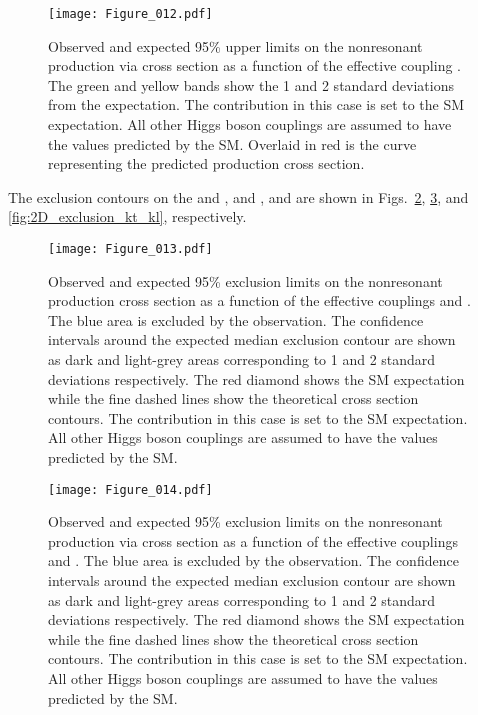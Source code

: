 \begin{figure}[htb!]
  \centering
  \texttt{[image: Figure\_012.pdf]}
  \caption{Observed and expected 95\% \CL upper limits on the nonresonant \HH production via \VBF cross section as a function of the effective coupling \CVV. The green and yellow bands show the 1 and 2 standard deviations from the expectation. The \GGF contribution in this case is set to the SM expectation. All other Higgs boson couplings are assumed to have the values predicted by the SM. Overlaid in red is the curve representing the predicted \HH production cross section.}
  \label{fig:limit_kvv_scan}
\end{figure}

The exclusion contours on the \klambda and \CVV, \CV and \CVV, \ktop and \klambda  are shown in Figs.~\ref{fig:2D_exclusion_kl_kvv}, \ref{fig:2D_exclusion_kv_kvv}, and \ref{fig:2D_exclusion_kt_kl}, respectively.

\begin{figure}[htb!]
  \centering
  \texttt{[image: Figure\_013.pdf]}
  \caption{Observed and expected 95\% \CL exclusion limits on the nonresonant \HH production cross section as a function of the effective couplings \klambda and \CVV. The blue area is excluded by the observation. The confidence intervals around the expected median exclusion contour are shown as dark and light-grey areas corresponding to 1 and 2 standard deviations respectively. The red diamond shows the SM expectation while the fine dashed lines show the theoretical cross section contours. The \GGF contribution in this case is set to the SM expectation. All other Higgs boson couplings are assumed to have the values predicted by the SM.
  }
  \label{fig:2D_exclusion_kl_kvv}
\end{figure}


\begin{figure}[htb!]
  \centering
  \texttt{[image: Figure\_014.pdf]}
  \caption{Observed and expected 95\% \CL exclusion limits on the nonresonant \HH production via \VBF cross section as a function of the effective couplings \CV and \CVV. The blue area is excluded by the observation. The confidence intervals around the expected median exclusion contour are shown as dark and light-grey areas corresponding to 1 and 2 standard deviations respectively. The red diamond shows the SM expectation while the fine dashed lines show the theoretical cross section contours. The \GGF contribution in this case is set to the SM expectation. All other Higgs boson couplings are assumed to have the values predicted by the SM.}
  \label{fig:2D_exclusion_kv_kvv}
\end{figure}



